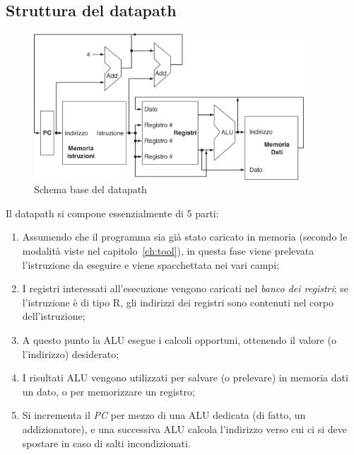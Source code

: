 \documentclass[class=book, crop=false, oneside]{standalone}
\begin{document}
\subsection{Struttura del datapath}
\begin{figure}[H]
	\centering
	\includegraphics[width=0.9\textwidth,keepaspectratio]{datap_1}
	\caption{Schema base del datapath}
\end{figure}
Il datapath si compone essenzialmente di 5 parti:
\begin{enumerate}
  \item Assumendo che il programma sia già stato caricato in memoria (secondo le modalità viste nel capitolo~\ref{ch:tool}), in questa fase viene prelevata l'istruzione da eseguire e viene spacchettata nei vari campi;
  \item I registri interessati all'esecuzione vengono caricati nel \emph{banco dei registri}; se l'istruzione è di tipo R, gli indirizzi dei registri sono contenuti nel corpo dell'istruzione;
  \item A questo punto la ALU esegue i calcoli opportuni, ottenendo il valore (o l'indirizzo) desiderato;
  \item I risultati ALU vengono utilizzati per salvare (o prelevare) in memoria dati un dato, o per memorizzare un registro;
  \item Si incrementa il \emph{PC} per mezzo di una ALU dedicata (di fatto, un addizionatore), e una successiva ALU calcola l’indirizzo verso cui ci si deve spostare in caso di salti incondizionati.
\end{enumerate}
\end{document}
